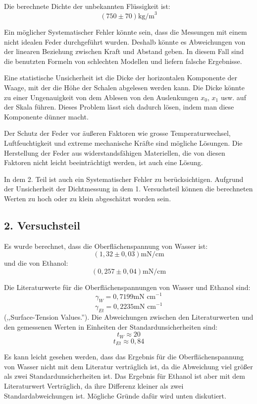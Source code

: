 \documentclass[11pt,a4paper]{article} %
\begin{document}
Die berechnete Dichte der unbekannten Flüssigkeit ist:
$$(750 \pm 70) \textrm{kg/m}^3$$

Ein möglicher Systematischer Fehler könnte sein, dass die Messungen mit einem nicht idealen Feder durchgeführt wurden. Deshalb könnte es Abweichungen von der linearen Beziehung zwischen Kraft und Abstand geben. In diesem Fall sind die benutzten Formeln von schlechten Modellen und liefern falsche Ergebnisse. 

Eine statistische Unsicherheit ist die Dicke der horizontalen Komponente der Waage, mit der die Höhe der Schalen abgelesen werden kann. Die Dicke könnte zu einer Ungenauigkeit von dem Ablesen von den Auslenkungen $x_0$, $x_1$ usw. auf der Skala führen. Dieses Problem lässt sich dadurch lösen, indem man diese Komponente dünner macht. 

Der Schutz der Feder vor äußeren Faktoren wie grosse 
Temperaturwechsel, Luftfeuchtigkeit und extreme mechanische Kräfte sind mögliche Lösungen. Die Herstellung der Feder aus widerstandsfähigen Materiellen, die von diesen Faktoren nicht leicht beeinträchtigt werden, ist auch eine Lösung. 

In dem 2. Teil ist auch ein Systematischer Fehler zu berücksichtigen. Aufgrund der Unsicherheit der Dichtmessung in dem 1. Versuchsteil können die berechneten Werten zu hoch oder zu klein abgeschätzt worden sein.

\subsection{2. Versuchsteil}
Es wurde berechnet, dass die Oberflächenspannung von Wasser ist:
$$(1,32\pm 0,03) \textrm{mN/cm}$$
und die von Ethanol:
$$(0,257 \pm 0,04) \textrm{mN/cm}$$

Die Literaturwerte für die Oberflächenspannungen von Wasser und Ethanol sind:
$$\gamma_W = 0,7199 \textrm{mN cm}^{-1}$$
$$\gamma_{Et} = 0,2235 \textrm{mN cm}^{-1}$$
(,,Surface-Tension Values.'').
Die Abweichungen zwischen den Literaturwerten und den gemessenen Werten in Einheiten der Standardunsicherheiten sind:
$$ t_W \approx 20 $$
$$ t_{Et} \approx 0,84$$

Es kann leicht gesehen werden, dass das Ergebnis für die Oberflächenspannung von Wasser nicht mit dem Literatur verträglich ist, da die Abweichung viel größer als zwei Standardunsicherheiten ist. Das Ergebnis für Ethanol ist aber mit dem Literaturwert Verträglich, da ihre Differenz kleiner als zwei Standardabweichungen ist. Mögliche Gründe dafür wird unten diskutiert.
\end{document}
